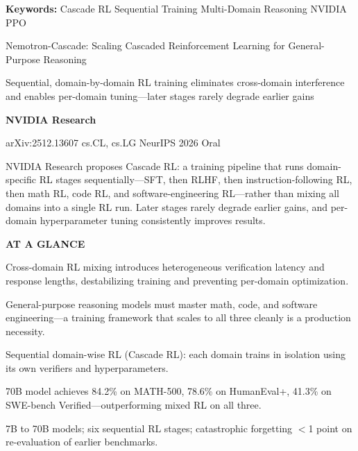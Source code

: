 \documentclass[10pt,twocolumn]{article}
\begin{document}
\setlength{\parindent}{0pt}
\setlength{\parskip}{4pt}

{\small\color{keywordgray}\textbf{Keywords:}
  Cascade RL \textbullet{} Sequential Training \textbullet{} Multi-Domain Reasoning \textbullet{} NVIDIA \textbullet{} PPO}\par\vspace{4pt}

{\LARGE\bfseries\raggedright Nemotron-Cascade: Scaling Cascaded Reinforcement Learning for General-Purpose Reasoning}\par\vspace{4pt}
{\large\itshape\raggedright Sequential, domain-by-domain RL training eliminates cross-domain interference and enables per-domain tuning---later stages rarely degrade earlier gains}\par\vspace{6pt}
{\small\textbf{NVIDIA Research}}\par\vspace{2pt}
{\small\color{keywordgray}arXiv:2512.13607 \textbullet{} cs.CL, cs.LG \textbullet{} NeurIPS 2026 Oral}
\par\vspace{2pt}\noindent{\color{rulered}\rule{\columnwidth}{0.6pt}}\vspace{6pt}

NVIDIA Research proposes Cascade RL: a training pipeline that runs domain-specific RL stages sequentially---SFT, then RLHF, then instruction-following RL, then math RL, code RL, and software-engineering RL---rather than mixing all domains into a single RL run.
Later stages rarely degrade earlier gains, and per-domain hyperparameter tuning consistently improves results.

\begin{mdframed}[backgroundcolor=boxgray,linecolor=rulered,linewidth=1pt,
    innerleftmargin=6pt,innerrightmargin=6pt,
    innertopmargin=6pt,innerbottommargin=6pt]
\textbf{\small AT A GLANCE}\par\vspace{4pt}
\begin{description}[leftmargin=0pt,labelsep=4pt,itemsep=2pt,parsep=0pt,
    font=\small\bfseries]
  \item[Problem:] Cross-domain RL mixing introduces heterogeneous verification latency and response lengths, destabilizing training and preventing per-domain optimization.
  \item[Why it matters:] General-purpose reasoning models must master math, code, and software engineering---a training framework that scales to all three cleanly is a production necessity.
  \item[Method:] Sequential domain-wise RL (Cascade RL): each domain trains in isolation using its own verifiers and hyperparameters.
  \item[Result:] 70B model achieves 84.2\% on MATH-500, 78.6\% on HumanEval+, 41.3\% on SWE-bench Verified---outperforming mixed RL on all three.
  \item[Evidence:] 7B to 70B models; six sequential RL stages; catastrophic forgetting $<$1 point on re-evaluation of earlier benchmarks.
\end{description}
\end{mdframed}
\end{document}
